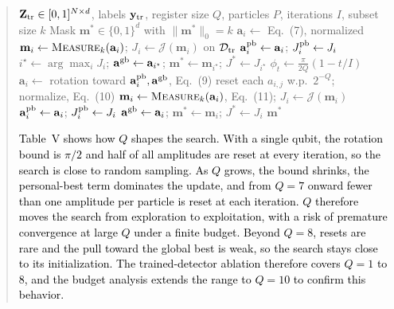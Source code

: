 \documentclass[11pt]{article}
\newenvironment{excerpt}{\begin{quote}\sloppy}{\end{quote}}
\begin{document}
\begin{excerpt}
\setcounter{algorithm}{0}
\begin{algorithm}[H]
\caption{\textcolor{black}{Variable-qubit QPSO feature
selection. Steps commented with Q are the only ones that depend on
the register size.}}

\color{black}
\small
\begin{algorithmic}[1]
\Require $\mathbf{Z}_{\rm tr}\in[0,1]^{N\times d}$, labels $\mathbf{y}_{\rm tr}$, register size $Q$, particles $P$, iterations $I$, subset size $k$
\Ensure Mask $\mathbf{m}^{*}\in\{0,1\}^{d}$ with $\|\mathbf{m}^{*}\|_0=k$
  \State $\mathbf{a}_i\gets$ Eq.~(7), normalized 
  \State $\mathbf{m}_i\gets\textsc{Measure}_k(\mathbf{a}_i)$; $J_i\gets\mathcal{J}(\mathbf{m}_i)$ on $\mathcal{D}_{\rm tr}$
  \State $\mathbf{a}_i^{\rm pb}\gets\mathbf{a}_i$; $J_i^{\rm pb}\gets J_i$
\EndFor
\State $i^{\star}\gets\arg\max_i J_i$; $\mathbf{a}^{\rm gb}\gets\mathbf{a}_{i^{\star}}$; $\mathbf{m}^{*}\gets\mathbf{m}_{i^{\star}}$; $J^{*}\gets J_{i^{\star}}$
  \State $\phi_t\gets\frac{\pi}{2Q}(1-t/I)$ 
    \State $\mathbf{a}_i\gets$ rotation toward $\mathbf{a}_i^{\rm pb},\mathbf{a}^{\rm gb}$, Eq.~(9)
    \State reset each $a_{i,j}$ w.p.\ $2^{-Q}$; normalize, Eq.~(10) 
    \State $\mathbf{m}_i\gets\textsc{Measure}_k(\mathbf{a}_i)$, Eq.~(11); $J_i\gets\mathcal{J}(\mathbf{m}_i)$
      \State $\mathbf{a}_i^{\rm pb}\gets\mathbf{a}_i$; $J_i^{\rm pb}\gets J_i$
    \EndIf
      \State $\mathbf{a}^{\rm gb}\gets\mathbf{a}_i$; $\mathbf{m}^{*}\gets\mathbf{m}_i$; $J^{*}\gets J_i$
    \EndIf
  \EndFor
\EndFor
\State \Return $\mathbf{m}^{*}$ 
\end{algorithmic}
\end{algorithm}

\textcolor{black}{Table~V shows
how $Q$ shapes the search. With a single qubit, the rotation bound is
$\pi/2$ and half of all amplitudes are reset at every iteration, so
the search is close to random sampling. As $Q$ grows, the bound
shrinks, the personal-best term dominates the update, and from $Q=7$
onward fewer than one amplitude per particle is reset at each
iteration. $Q$ therefore
moves the search from exploration to exploitation, with a risk of
premature convergence at large $Q$ under a finite budget. Beyond
$Q=8$, resets are rare and the pull toward the global best is weak,
so the search stays close to its initialization. The trained-detector
ablation therefore covers $Q=1$ to $8$, and the budget analysis
extends the range to $Q=10$ to confirm this behavior.}


\end{excerpt}
\end{document}
